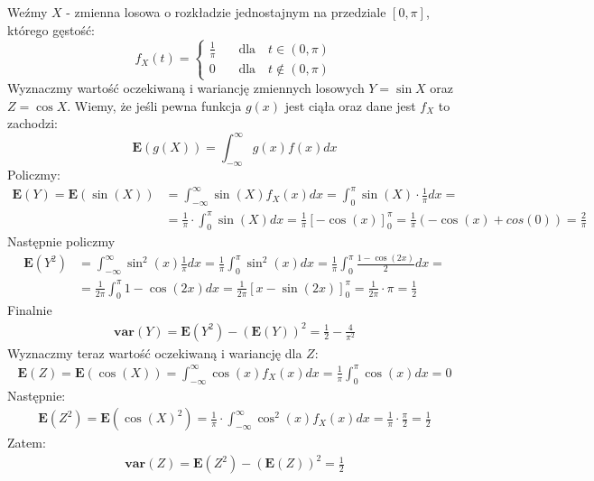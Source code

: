 \documentclass{article}
\begin{document}
Weźmy $X$ - zmienna losowa o rozkładzie jednostajnym na przedziale $[0,\pi]$, którego gęstość:
\[
    f_X(t) = \begin{cases}
        \frac{1}{\pi} \quad &\text{dla} \quad t\in(0,\pi) \\
        0 \quad &\text{dla} \quad t\notin(0,\pi)
    \end{cases} 
\]
Wyznaczmy wartość oczekiwaną i wariancję zmiennych losowych $Y=\sin X$ oraz $Z=\cos X$. Wiemy, że jeśli 
pewna funkcja $g(x)$ jest ciąła oraz dane jest $f_X$ to zachodzi:
\[
    \mathbf{E}(g(X)) = \int_{-\infty}^{\infty} g(x) f(x) dx
\]
Policzmy:
\setcounter{equation}{0}
\begin{align}
    \mathbf{E}(Y) = \mathbf{E}(\sin(X))
    &= \int_{-\infty}^{\infty} \sin(X) f_X(x) dx
    = \int_{0}^{\pi} \sin(X) \cdot \frac{1}{\pi} dx =\\
    &= \frac{1}{\pi} \cdot \int_{0}^{\pi} \sin(X) dx 
    = \frac{1}{\pi} \left[-\cos(x) \right]_{0}^{\pi}
    = \frac{1}{\pi} \left(-\cos(x) + cos(0)\right)
    = \frac{2}{\pi}
\end{align}
Następnie policzmy
\begin{align}
    \mathbf{E}(Y^2) &= \int_{-\infty}^{\infty} \sin^2(x) \frac{1}{\pi} dx 
    = \frac{1}{\pi} \int_{0}^{\pi} \sin^2(x) dx
    = \frac{1}{\pi} \int_{0}^{\pi} \frac{1-\cos(2x)}{2} dx =\\
    &= \frac{1}{2\pi} \int_{0}^{\pi} 1-\cos(2x) dx
    = \frac{1}{2\pi} \left[x - \sin(2x) \right]_{0}^{\pi}
    = \frac{1}{2\pi} \cdot \pi
    = \frac{1}{2}
\end{align}
Finalnie
\begin{align}
    \mathbf{var}(Y) = \mathbf{E}(Y^2) - (\mathbf{E}(Y))^2 = \frac{1}{2} - \frac{4}{\pi^2}
\end{align}
Wyznaczmy teraz wartość oczekiwaną i wariancję dla $Z$:
\begin{align}
    \mathbf{E}(Z) = \mathbf{E}(\cos(X))
    = \int_{-\infty}^{\infty} \cos(x) f_X(x) dx
    = \frac{1}{\pi} \int_{0}^{\pi} \cos(x) dx = 0
\end{align}
Następnie:
\begin{align}
    \mathbf{E}(Z^2) = \mathbf{E}(\cos(X)^2) 
    = \frac{1}{\pi} \cdot \int_{-\infty}^{\infty} \cos^2(x) f_X(x) dx
    = \frac{1}{\pi} \cdot \frac{\pi}{2} = \frac{1}{2}
\end{align}
Zatem:
\begin{align}
    \mathbf{var}(Z) = \mathbf{E}(Z^2) - (\mathbf{E}(Z))^2 = \frac{1}{2}
\end{align}
\end{document}
